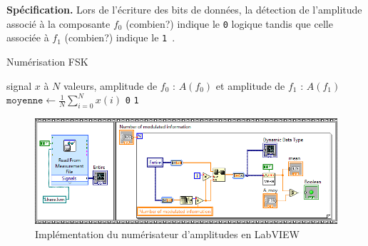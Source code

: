 \documentclass[twocolumn,pre,floats,aps,amsmath,amssymb]{revtex4}
\newenvironment{definition}[1][D\'efinition.]{\begin{trivlist}
\item[\hskip \labelsep {\bfseries #1}]}{\end{trivlist}}
\newenvironment{remark}[1][Remarque.]{\begin{trivlist}
\item[\hskip \labelsep {\bfseries #1}]}{\end{trivlist}}
\begin{document}
\noindent
\textbf{Sp\'ecification.}
  Lors de l'\'ecriture des bits de donn\'ees, la d\'etection de l'amplitude associ\'e \`a la composante $f_0$ (combien?) indique le \texttt{0} logique tandis que celle associ\'ee \`a $f_1$ (combien?) indique le \texttt{1}~\cite{Comment1}.

\begin{algorithm}[h]
\caption{Num\'erisation FSK}
\label{algo_numerisation_FSK}
\begin{algorithmic}[1]
  \REQUIRE signal $x$ \`a $N$ valeurs, amplitude de $f_0$ : $A(f_0)$ et amplitude de $f_1$ : $A(f_1)$
  \STATE $\texttt{moyenne} \leftarrow \frac{1}{N}\sum^N_{i = 0}{x(i)}$
  \RETURN \texttt{0}
  \ELSE
  \RETURN \texttt{1}
  \ENDIF
\end{algorithmic}
\end{algorithm}


\begin{figure}[]
  \includegraphics[width=15cm]{pictures/numerisation_amplitude.png}
\caption{Impl\'ementation du num\'erisateur d'amplitudes en LabVIEW}
\label{fig:algo_numerisation_FSK_labview}
\end{figure}


\end{document}

